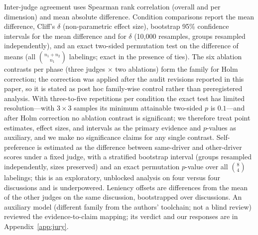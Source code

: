 Inter-judge agreement uses Spearman rank correlation (overall and per
dimension) and mean absolute difference. Condition comparisons report
the mean difference, Cliff's $\delta$ (non-parametric effect size),
bootstrap 95\% confidence intervals for the mean difference and for
$\delta$ (10{,}000 resamples, groups resampled independently), and an
exact two-sided permutation test on the difference of means (all
$\binom{n_1+n_2}{n_1}$ labelings; exact in the presence of ties). The
six ablation contrasts per phase (three judges $\times$ two ablations)
form the family for Holm correction; the correction was applied after
the audit revisions reported in this paper, so it is stated as post hoc
family-wise control rather than preregistered analysis. With
three-to-five repetitions per condition the exact test
has limited resolution---with $3\times3$ samples its minimum attainable
two-sided $p$ is $0.1$---and after Holm correction no ablation contrast
is significant; we therefore treat point estimates, effect sizes, and
intervals as the primary evidence and $p$-values as auxiliary, and we
make no significance claims for any single contrast. Self-preference is
estimated as the difference between same-driver and other-driver scores
under a fixed judge, with a stratified bootstrap interval (groups
resampled independently, sizes preserved) and an exact permutation
$p$-value over all $\binom{8}{4}$ labelings; this is an exploratory,
unblocked analysis on four versus four discussions and is
underpowered. Leniency offsets are
differences from the mean of the other judges on the same discussion,
bootstrapped over discussions. An auxiliary model (different family from the authors'
toolchain; not a blind review) reviewed the evidence-to-claim mapping;
its verdict and our responses are in Appendix~\ref{app:jury}.
